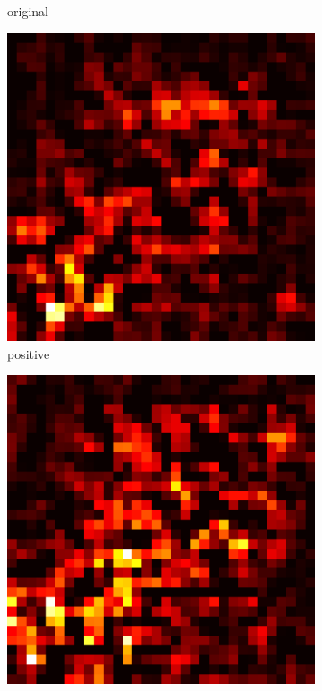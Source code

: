 \documentclass[preprint,12pt]{elsarticle}
\begin{document}
\begin{figure}
\begin{subfigure}{0.14\linewidth}
        \caption{original}
    \end{subfigure}
    \hfill
    \begin{subfigure}{0.14\textwidth}
        \centering
        \includegraphics[width=\linewidth]{../visualizations/examples/cifar10/cnn/positive_saliency_map/3.png}
        \caption{positive}
    \end{subfigure}
    \hfill
    \begin{subfigure}{0.14\textwidth}
        \centering
        \includegraphics[width=\linewidth]{../visualizations/examples/cifar10/cnn/negative_saliency_map/3.png}

\end{subfigure}
\end{figure}
\end{document}
